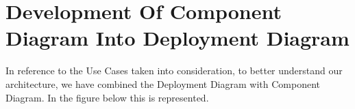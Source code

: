 \chapter{\textbf{Development Of Component Diagram Into Deployment Diagram}}

In reference to the Use Cases taken into consideration, to better understand our architecture, we have combined the Deployment Diagram with Component Diagram. In the figure below this is represented.

\begin{center}
\end{center}
\bigskip
{}